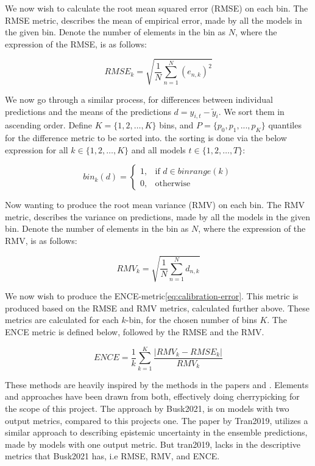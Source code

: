 We now wish to calculate the root mean squared error (RMSE) on each bin. The RMSE metric, describes the mean of empirical error, made
by all the models in the given bin. 
Denote the number of elements in the bin as $N$, where the
expression of the RMSE, is as follows:

\begin{equation}
    RMSE_{k} = \sqrt{\frac{1}{N} \sum_{n=1}^N \left( e_{n,k} \right)^2}
\end{equation}

We now go through a similar process, for differences between individual predictions and the means of the predictions 
$d = y_{i,t} - \tilde{y}_{i}$. We sort them in ascending order. Define $K = \{1,2,\ldots,K\}$ bins, and $P = \{p_0, p_1, ..., p_K\}$ 
quantiles for the difference metric to be sorted into. the sorting is done via the below expression for all $k \in \{1,2,\ldots,K\}$ 
and all models $t \in \{1,2,\ldots,T\}$:

\begin{equation}\label{eq:bin-difference}
    bin_{k}(d) =\begin{cases}
        1, & \text{if } d \in binrange(k) \\
        0, & \text{otherwise}
    \end{cases}
\end{equation}

Now wanting to produce the root mean variance (RMV) on each bin. The RMV metric, describes the variance on predictions, made
by all the models in the given bin.
Denote the number of elements in the bin as $N$, where the
expression of the RMV, is as follows:

\begin{equation}
    RMV_{k} = \sqrt{\frac{1}{N} \sum_{n=1}^N  d_{n,k}}
\end{equation}

We now wish to produce the ENCE-metric\ref{eq:calibration-error}\cite{Busk2021}.
This metric is produced based on the RMSE and RMV metrics, calculated further above.
These metrics are calculated for each $k$-bin, for the chosen number of bins $K$. The ENCE metric
is defined below, followed by the RMSE and the RMV.

\begin{equation}\label{eq:calibration-error}
    ENCE = \frac{1}{k} \sum_{k=1}^K \frac{|RMV_{k} - RMSE_{k}|}{RMV_{k}}
\end{equation}

These methods are heavily inspired by the methods in the papers\cite{Tran2019} and \cite{Busk2021}. Elements and approaches have been 
drawn from both, effectively doing cherrypicking for the scope of this project. The approach by Busk2021, is on models with two output
metrics, compared to this projects one. The paper by Tran2019, utilizes a similar approach to describing epistemic uncertainty in the
ensemble predictions, made by models with one output metric. But tran2019, lacks in the descriptive metrics that Busk2021 has, i.e 
RMSE, RMV, and ENCE.


\newpage